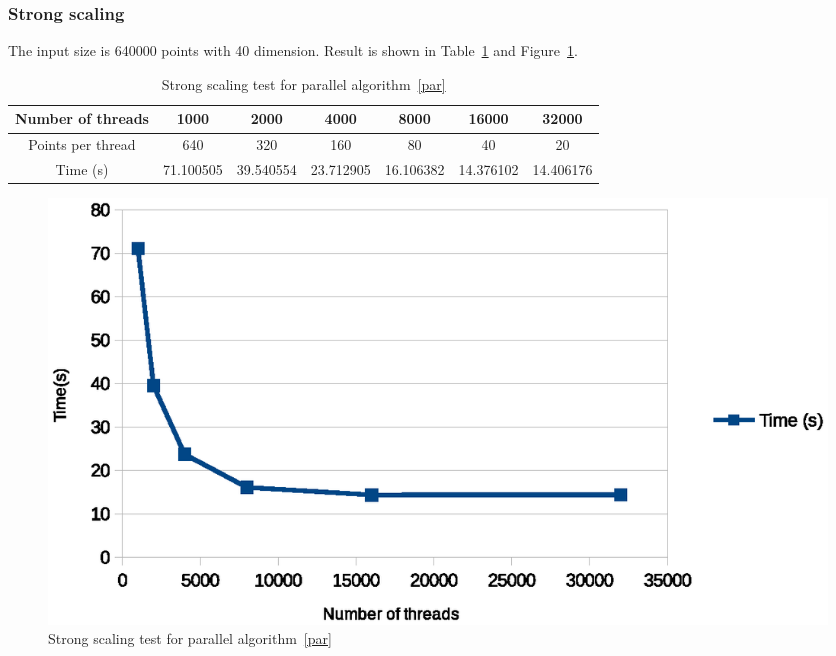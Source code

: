 \subsubsection{Strong scaling}
The input size is 640000 points with 40 dimension. Result is shown in Table~\ref{tab:strong-scaling} and
Figure~\ref{fig:strong_scaling}. 
\begin{table}[ht]
  \centering
  \begin{tabular}{|c|c|c|c|c|c|c|}
    \hline
    Number of threads	& 1000	    & 2000	    & 4000	& 8000	& 16000 & 32000\\
    \hline
    Points per thread 	&640	&320	&160	&80	&40	&20 \\
    \hline
    Time (s)	 & 71.100505	& 39.540554	& 23.712905	& 16.106382	& 14.376102	& 14.406176	\\
    \hline
  \end{tabular}
  \label{tab:strong-scaling}
  \caption{Strong scaling test for parallel algorithm~\ref{par}}
\end{table}
\begin{figure}[!h]
  \centering
  \includegraphics[width=\linewidth]{fig/strong_scaling}
  \caption{Strong scaling test for parallel algorithm~\ref{par}}
  \label{fig:strong_scaling}
\end{figure}


